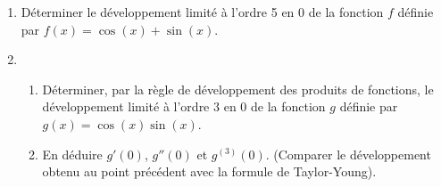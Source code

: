 
\begin{exercice}\label{exoautoanalyseCTU-42}
 
\begin{enumerate}
\item Déterminer le développement limité à l'ordre 5 en 0 de la fonction $f$ définie par $f(x)=\cos (x) +\sin (x)$.
\item \begin{enumerate}
\item Déterminer, par la règle de développement des produits de fonctions, le développement limité à l'ordre 3 en 0 de la fonction $g$ définie par $g(x)=\cos (x) \sin (x)$.
\item En déduire $g'(0)$, $g''(0)$ et $g^{(3)}(0)$. (Comparer le développement obtenu au point précédent avec la formule de Taylor-Young).
\end{enumerate}
\end{enumerate}

\end{exercice}

